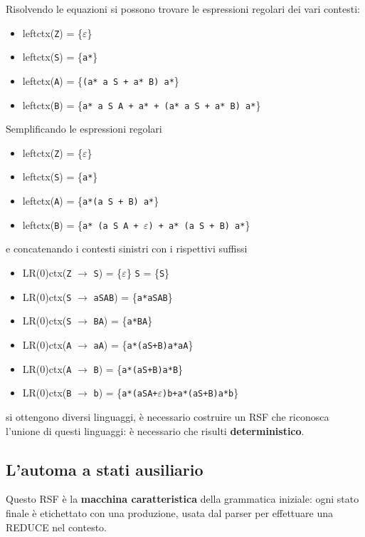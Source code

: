 Risolvendo le equazioni si possono trovare le espressioni regolari dei vari contesti:
\begin{itemize}
    \item leftctx(\texttt{Z}) = \{$\varepsilon$\}
    \item leftctx(\texttt{S}) = \{\texttt{a*}\}
    \item leftctx(\texttt{A}) = \{\texttt{(a* a S + a* B) a*}\}
    \item leftctx(\texttt{B}) = \{\texttt{a* a S A + a* + (a* a S + a* B) a*}\}
\end{itemize}
\setlist{}

Semplificando le espressioni regolari
\begin{itemize}
    \item leftctx(\texttt{Z}) = \{$\varepsilon$\}
    \item leftctx(\texttt{S}) = \{\texttt{a*}\}
    \item leftctx(\texttt{A}) = \{\texttt{a*(a S + B) a*}\}
    \item leftctx(\texttt{B}) = \{\texttt{a* (a S A + $\varepsilon$) + a* (a S + B) a*}\}
\end{itemize}
\setlist{}
e concatenando i contesti sinistri con i rispettivi suffissi
\begin{itemize}
    \item LR(0)ctx(\texttt{Z} $\rightarrow$ \texttt{S}) = \{$\varepsilon$\} \texttt{S} = \{\texttt{S}\}
    \item LR(0)ctx(\texttt{S} $\rightarrow$ \texttt{aSAB}) = \{\texttt{a*aSAB}\}
    \item LR(0)ctx(\texttt{S} $\rightarrow$ \texttt{BA}) = \{\texttt{a*BA}\}
    \item LR(0)ctx(\texttt{A} $\rightarrow$ \texttt{aA}) = \{\texttt{a*(aS+B)a*aA}\}
    \item LR(0)ctx(\texttt{A} $\rightarrow$ \texttt{B}) = \{\texttt{a*(aS+B)a*B}\}
    \item LR(0)ctx(\texttt{B} $\rightarrow$ \texttt{b}) = \{\texttt{a*(aSA+$\varepsilon$)b+a*(aS+B)a*b}\}
\end{itemize}
\setlist{}
si ottengono diversi linguaggi, è necessario costruire un RSF che riconosca l'unione di questi linguaggi: è necessario che risulti \textbf{deterministico}.

\subsection{L'automa a stati ausiliario}
Questo RSF è la \textbf{macchina caratteristica} della grammatica iniziale: ogni stato finale è etichettato con una produzione, usata dal parser per effettuare una REDUCE nel contesto.


